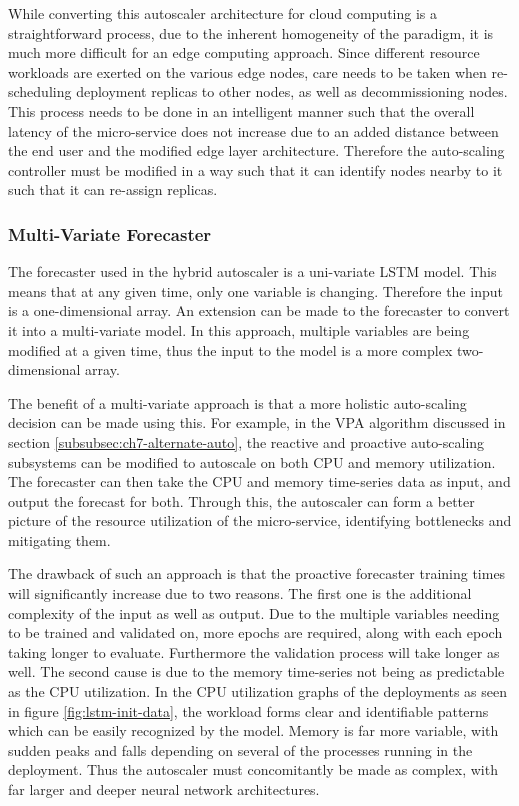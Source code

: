 While converting this autoscaler architecture for cloud computing is a straightforward process, due to the inherent homogeneity of the paradigm, it is much more difficult for an edge computing approach. Since different resource workloads are exerted on the various edge nodes, care needs to be taken when re-scheduling deployment replicas to other nodes, as well as decommissioning nodes. This process needs to be done in an intelligent manner such that the overall latency of the micro-service does not increase due to an added distance between the end user and the modified edge layer architecture. Therefore the auto-scaling controller must be modified in a way such that it can identify nodes nearby to it such that it can re-assign replicas.

\subsubsection{Multi-Variate Forecaster}
\label{subsubsec:ch7-multi-variate}

The forecaster used in the hybrid autoscaler is a uni-variate LSTM model. This means that at any given time, only one variable is changing. Therefore the input is a one-dimensional array. An extension can be made to the forecaster to convert it into a multi-variate model. In this approach, multiple variables are being modified at a given time, thus the input to the model is a more complex two-dimensional array.\par

The benefit of a multi-variate approach is that a more holistic auto-scaling decision can be made using this. For example, in the VPA algorithm discussed in section \ref{subsubsec:ch7-alternate-auto}, the reactive and proactive auto-scaling subsystems can be modified to autoscale on both CPU and memory utilization. The forecaster can then take the CPU and memory time-series data as input, and output the forecast for both. Through this, the autoscaler can form a better picture of the resource utilization of the micro-service, identifying bottlenecks and mitigating them.\par

The drawback of such an approach is that the proactive forecaster training times will significantly increase due to two reasons. The first one is the additional complexity of the input as well as output. Due to the multiple variables needing to be trained and validated on, more epochs are required, along with each epoch taking longer to evaluate. Furthermore the validation process will take longer as well. The second cause is due to the memory time-series not being as predictable as the CPU utilization. In the CPU utilization graphs of the deployments as seen in figure \ref{fig:lstm-init-data}, the workload forms clear and identifiable patterns which can be easily recognized by the model. Memory is far more variable, with sudden peaks and falls depending on several of the processes running in the deployment. Thus the autoscaler must concomitantly be made as complex, with far larger and deeper neural network architectures.\par

